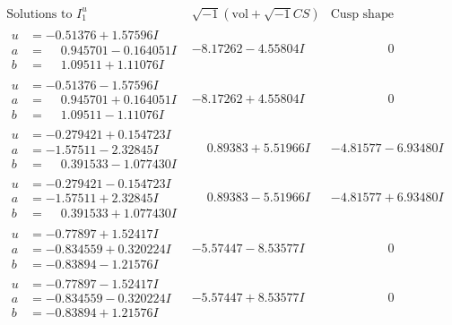 \documentclass[1p]{elsarticle_modified}
\theoremstyle{definition}
\newcommand{\I}{\sqrt{-1}}
\begin{document}
$$\begin{array}{c|c|c}
 \end{array}$$\newpage$$\begin{array}{c|c|c}  
\text{Solutions to }I^u_{1}& \I (\text{vol} + \sqrt{-1}CS) & \text{Cusp shape}\\
 \hline 
\begin{aligned}
u &= -0.51376 + 1.57596 I \\
a &= \phantom{-}0.945701 - 0.164051 I \\
b &= \phantom{-}1.09511 + 1.11076 I\end{aligned}
 & -8.17262 - 4.55804 I & \phantom{-0.000000 } 0 \\ \hline\begin{aligned}
u &= -0.51376 - 1.57596 I \\
a &= \phantom{-}0.945701 + 0.164051 I \\
b &= \phantom{-}1.09511 - 1.11076 I\end{aligned}
 & -8.17262 + 4.55804 I & \phantom{-0.000000 } 0 \\ \hline\begin{aligned}
u &= -0.279421 + 0.154723 I \\
a &= -1.57511 - 2.32845 I \\
b &= \phantom{-}0.391533 - 1.077430 I\end{aligned}
 & \phantom{-}0.89383 + 5.51966 I & -4.81577 - 6.93480 I \\ \hline\begin{aligned}
u &= -0.279421 - 0.154723 I \\
a &= -1.57511 + 2.32845 I \\
b &= \phantom{-}0.391533 + 1.077430 I\end{aligned}
 & \phantom{-}0.89383 - 5.51966 I & -4.81577 + 6.93480 I \\ \hline\begin{aligned}
u &= -0.77897 + 1.52417 I \\
a &= -0.834559 + 0.320224 I \\
b &= -0.83894 - 1.21576 I\end{aligned}
 & -5.57447 - 8.53577 I & \phantom{-0.000000 } 0 \\ \hline\begin{aligned}
u &= -0.77897 - 1.52417 I \\
a &= -0.834559 - 0.320224 I \\
b &= -0.83894 + 1.21576 I\end{aligned}
 & -5.57447 + 8.53577 I & \phantom{-0.000000 } 0 \\ \hline\begin{aligned}

\end{aligned}
\end{array}$$
\end{document}
